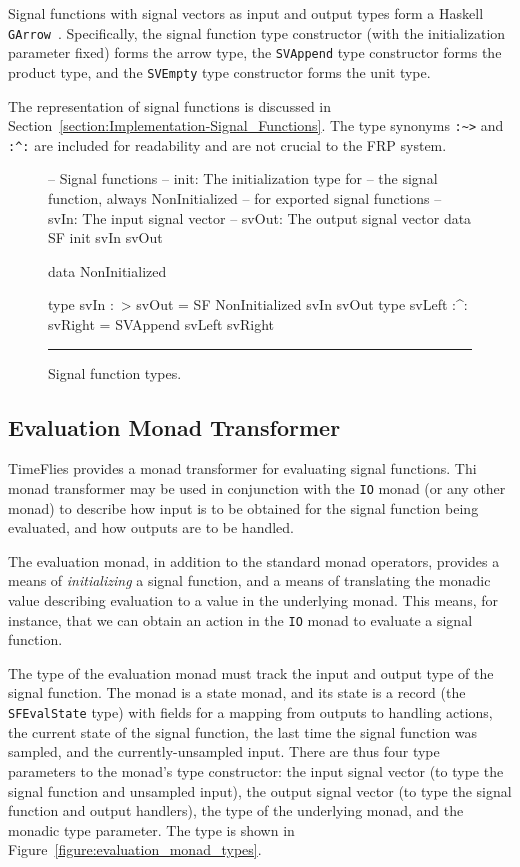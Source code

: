 Signal functions with signal vectors as input and output types form a
Haskell {\tt GArrow}~\cite{Megacz2011}. Specifically, the signal function
type constructor (with the initialization parameter fixed) forms the arrow
type, the {\tt SVAppend} type constructor forms the product type, and the
{\tt SVEmpty} type constructor forms the unit type.

The representation of signal functions is discussed in
Section~\ref{section:Implementation-Signal_Functions}. The type synonyms
{\tt :\textasciitilde>} and {\tt :\textasciicircum:} are included for
readability and are not crucial to the FRP system.

\begin{figure}
\begin{code}
-- Signal functions
-- init: The initialization type for 
--   the signal function, always NonInitialized
--   for exported signal functions
-- svIn: The input signal vector
-- svOut: The output signal vector
data SF init svIn svOut

data NonInitialized

type svIn :~> svOut = SF NonInitialized svIn svOut
type svLeft :^: svRight = SVAppend svLeft svRight
\end{code}
\hrule
\caption{Signal function types.}
\label{figure:signal_function_types}
\end{figure}

\subsection{Evaluation Monad Transformer}
\label{section:System_Design_and_Interface-Types-Evaluation_Monad_Transformer}

TimeFlies provides a monad transformer for evaluating signal functions. Thi
monad transformer may be used in conjunction with the {\tt IO} monad (or any
other monad) to describe how input is to be obtained for the signal function
being evaluated, and how outputs are to be handled.

The evaluation monad, in addition to the standard monad operators, provides a
means of {\em initializing} a signal function, and a means of translating the
monadic value describing evaluation to a value in the underlying monad. This
means, for instance, that we can obtain an action in the {\tt IO} monad to
evaluate a signal function.

The type of the evaluation monad must track the input and output type of the
signal function. The monad is a state monad, and its state is a record (the
{\tt SFEvalState} type) with fields for a mapping from outputs to handling
actions, the current state of the signal function, the last time the signal
function was sampled, and the currently-unsampled input. There are thus four
type parameters to the monad's type constructor: the input signal vector (to
type the signal function and unsampled input), the output signal vector (to type
the signal function and output handlers), the type of the underlying monad, and
the monadic type parameter. The type is shown in
Figure~\ref{figure:evaluation_monad_types}.

